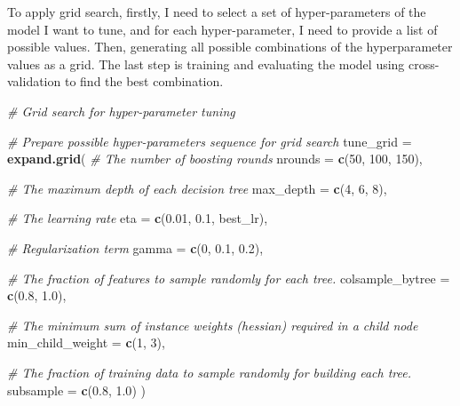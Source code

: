 \documentclass[
]{article}
\newenvironment{Shaded}{\begin{snugshade}}{\end{snugshade}}
\newcommand{\AttributeTok}[1]{\textcolor[rgb]{0.13,0.29,0.53}{#1}}
\newcommand{\CommentTok}[1]{\textcolor[rgb]{0.56,0.35,0.01}{\textit{#1}}}
\newcommand{\DecValTok}[1]{\textcolor[rgb]{0.00,0.00,0.81}{#1}}
\newcommand{\FloatTok}[1]{\textcolor[rgb]{0.00,0.00,0.81}{#1}}
\newcommand{\FunctionTok}[1]{\textcolor[rgb]{0.13,0.29,0.53}{\textbf{#1}}}
\newcommand{\NormalTok}[1]{#1}
\newcommand{\OtherTok}[1]{\textcolor[rgb]{0.56,0.35,0.01}{#1}}
\begin{document}
To apply grid search, firstly, I need to select a set of
hyper-parameters of the model I want to tune, and for each
hyper-parameter, I need to provide a list of possible values. Then,
generating all possible combinations of the hyperparameter values as a
grid. The last step is training and evaluating the model using
cross-validation to find the best combination.

\begin{Shaded}
\begin{Highlighting}[]
\CommentTok{\# Grid search for hyper{-}parameter tuning}

\CommentTok{\# Prepare possible hyper{-}parameters sequence for grid search}
\NormalTok{tune\_grid }\OtherTok{=} \FunctionTok{expand.grid}\NormalTok{(}
  \CommentTok{\# The number of boosting rounds}
  \AttributeTok{nrounds =} \FunctionTok{c}\NormalTok{(}\DecValTok{50}\NormalTok{, }\DecValTok{100}\NormalTok{, }\DecValTok{150}\NormalTok{),}
  
  \CommentTok{\# The maximum depth of each decision tree}
  \AttributeTok{max\_depth =} \FunctionTok{c}\NormalTok{(}\DecValTok{4}\NormalTok{, }\DecValTok{6}\NormalTok{, }\DecValTok{8}\NormalTok{),}
  
  \CommentTok{\# The learning rate}
  \AttributeTok{eta =} \FunctionTok{c}\NormalTok{(}\FloatTok{0.01}\NormalTok{, }\FloatTok{0.1}\NormalTok{, best\_lr),}
  
  \CommentTok{\# Regularization term}
  \AttributeTok{gamma =} \FunctionTok{c}\NormalTok{(}\DecValTok{0}\NormalTok{, }\FloatTok{0.1}\NormalTok{, }\FloatTok{0.2}\NormalTok{),}
  
  \CommentTok{\# The fraction of features to sample randomly for each tree.}
  \AttributeTok{colsample\_bytree =} \FunctionTok{c}\NormalTok{(}\FloatTok{0.8}\NormalTok{, }\FloatTok{1.0}\NormalTok{),}
  
  \CommentTok{\# The minimum sum of instance weights (hessian) required in a child node}
  \AttributeTok{min\_child\_weight =} \FunctionTok{c}\NormalTok{(}\DecValTok{1}\NormalTok{, }\DecValTok{3}\NormalTok{),}
  
  \CommentTok{\# The fraction of training data to sample randomly for building each tree.}
  \AttributeTok{subsample =} \FunctionTok{c}\NormalTok{(}\FloatTok{0.8}\NormalTok{, }\FloatTok{1.0}\NormalTok{)}
\NormalTok{)}


\end{Highlighting}
\end{Shaded}
\end{document}

